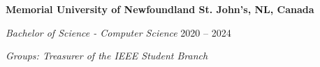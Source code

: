 \textbf{Memorial University of Newfoundland \hfill St. John's, NL, Canada} \par
\textit{Bachelor of Science - Computer Science} \hfill 2020 -- 2024\par
\textit{Groups: Treasurer of the IEEE Student Branch}